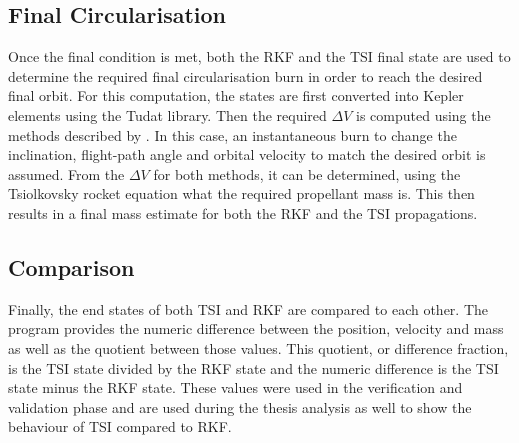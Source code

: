 \subsection{Final Circularisation}
\label{subsec:finalCircularisation}
Once the final condition is met, both the \ac{RKF} and the \ac{TSI} final state are used to determine the required final circularisation burn in order to reach the desired final orbit. For this computation, the states are first converted into Kepler elements using the \ac{Tudat} library. Then the required $\Delta V$ is computed using the methods described by \cite{wakker2010}. In this case, an instantaneous burn to change the inclination, flight-path angle and orbital velocity to match the desired orbit is assumed. From the $\Delta V$ for both methods, it can be determined, using   the Tsiolkovsky rocket equation what the required propellant mass is. This then results in a final mass estimate for both the \ac{RKF} and the \ac{TSI} propagations.


\subsection{Comparison}
\label{subsec:comparison}
Finally, the end states of both \ac{TSI} and \ac{RKF} are compared to each other. The program provides the numeric difference between the position, velocity and mass as well as the quotient between those values. This quotient, or difference fraction, is the \ac{TSI} state divided by the \ac{RKF} state and the numeric difference is the \ac{TSI} state minus the \ac{RKF} state. These values were used in the verification and validation phase and are used during the thesis analysis as well to show the behaviour of \ac{TSI} compared to \ac{RKF}.  


